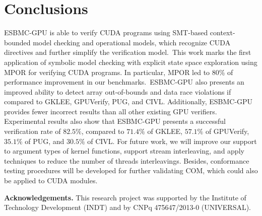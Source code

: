 \documentclass[times, doublespace]{cpeauth}
\begin{document}
\vspace{-6pt}
\section{Conclusions}
\label{sec:conclusions}
\vspace{-2pt}

ESBMC-GPU is able to verify CUDA programs using SMT-based context-bounded model checking and operational models, which recognize CUDA directives and further simplify the verification model.\ This work marks the first application of symbolic model checking with explicit state space exploration using MPOR for verifying CUDA programs. In particular, MPOR led to $80$\% of performance improvement in our benchmarks.\
ESBMC-GPU also presents an improved ability to detect array out-of-bounds and data race violations if compared to GKLEE, GPUVerify, PUG, and CIVL. Additionally, ESBMC-GPU provides fewer incorrect results than all other existing GPU verifiers.
Experimental results also show that ESBMC-GPU presents a successful verification rate of $82.5\%$, compared to $71.4\%$ of GKLEE, $57.1\%$ of GPUVerify, $35.1\%$ of PUG, and $30.5\%$ of CIVL. For future work, we will improve our support to argument types of kernel functions, support stream interleaving, and apply techniques to reduce the number of threads interleavings. Besides, conformance testing procedures will be developed for further validating COM, which could also be applied to CUDA modules.

\noindent \textbf{Acknowledgements.} This research project was supported by the Institute of Technology Development (INDT) and by CNPq 475647/2013-0 (UNIVERSAL).
\end{document}
